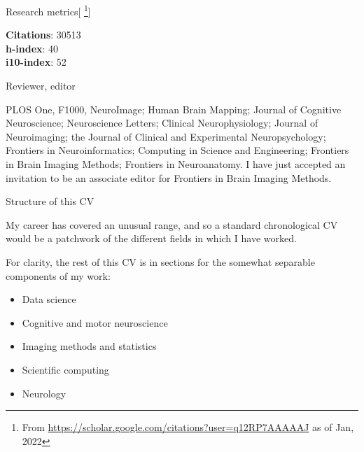 \documentclass{cv}
\begin{document}
\begin{cvSection}{Research metrics}[
    \footnote{ From
    \url{https://scholar.google.com/citations?user=q12RP7AAAAAJ} as of Jan,
2022}]

{\bf Citations}: 30513 \\
{\bf h-index}: 40 \\
{\bf i10-index}: 52

\end{cvSection}

\begin{cvSection}{Reviewer, editor}

    PLOS One, F1000, NeuroImage; Human Brain Mapping; Journal of Cognitive
    Neuroscience; Neuroscience Letters; Clinical Neurophysiology; Journal of
    Neuroimaging; the Journal of Clinical and Experimental Neuropsychology;
    Frontiers in Neuroinformatics; Computing in Science and Engineering;
    Frontiers in Brain Imaging Methods; Frontiers in Neuroanatomy.  I have just
    accepted an invitation to be an associate editor for Frontiers in Brain
    Imaging Methods.

\end{cvSection}

\begin{cvSection}{Structure of this CV}

        My career has covered an unusual range, and so a standard chronological
        CV would be a patchwork of the different fields in which I have worked.

        For clarity, the rest of this CV is in sections for the somewhat
        separable components of my work:

        \begin{itemize}
            \item Data science
            \item Cognitive and motor neuroscience
            \item Imaging methods and statistics
            \item Scientific computing
            \item Neurology
        \end{itemize}

\end{cvSection}
\end{document}
